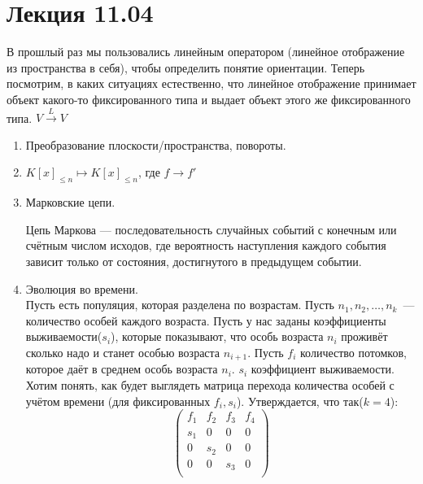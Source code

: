 \section{Лекция 11.04}
\begin{motivation}
    В прошлый раз мы пользовались линейным оператором (линейное отображение из пространства в себя),
    чтобы определить понятие ориентации. Теперь посмотрим, в каких ситуациях естественно,
    что линейное отображение принимает объект какого-то фиксированного типа и выдает объект этого же фиксированного типа. $V\xrightarrow{L}V$
\end{motivation}
\begin{examples}
    \begin{enumerate}
        \item Преобразование плоскости/пространства, повороты.
        \item $K[x]_{\le n} \mapsto K[x]_{\le n}$, где  $f\rightarrow f'$
        \item Марковские цепи. \\
        \begin{definition}
            \label{def:Марков}
            Цепь Маркова — последовательность случайных событий с конечным или счётным числом исходов,
            где вероятность наступления каждого события зависит только от состояния, достигнутого в предыдущем событии.
        \end{definition}
        \item Эволюция во времени.\\
            Пусть есть популяция, которая разделена по возрастам. Пусть $n_1, n_2,\dots, n_k$~--- количество особей каждого
			возраста. Пусть у нас заданы коэффициенты выживаемости($s_i$), которые показывают, что особь возраста $n_i$ проживёт
            сколько надо и станет особью возраста $n_{i+1}$. Пусть $f_i$ количество потомков, которое даёт в среднем особь возраста $n_i$.
            $s_i$ коэффициент выживаемости. 
            Хотим понять, как будет выглядеть матрица перехода количества особей с учётом времени (для фиксированных $f_i, s_i$).
            Утверждается, что так($k = 4$):
            \[
            \begin{pmatrix}
                f_1&f_2&f_3&f_4\\
                s_1&0&0&0\\
                0&s_2&0&0\\
                0&0&s_3&0\\
            \end{pmatrix}
\]
\end{enumerate}
\end{examples}
